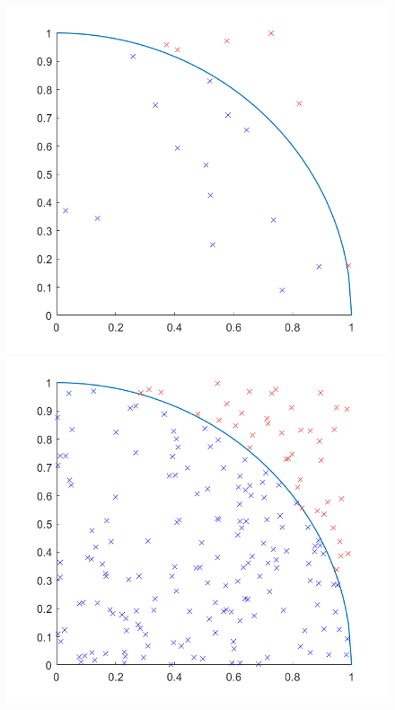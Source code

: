 \begin{figure}[htbp]
    \begin{minipage}{0.3\textwidth}
        \centering
	\includegraphics[width=\linewidth]{fig/4_quartercircle_1plot.png}
    \end{minipage}
    \hfill
    \begin{minipage}{0.3\textwidth}
        \centering
	\includegraphics[width=\linewidth]{fig/4_quartercircle_2plot.png}

\end{minipage}
\end{figure}
